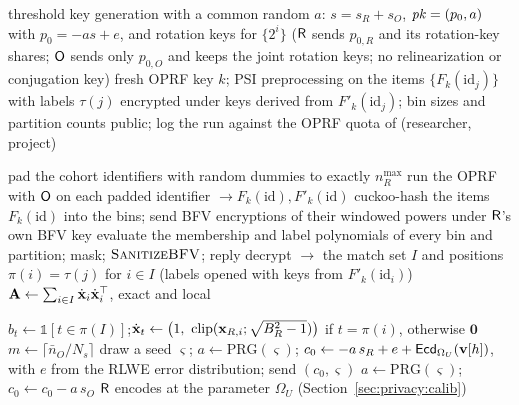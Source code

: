 \begin{algorithm}[p]
\begin{algorithmic}[1]
\State \Bdo threshold key generation with a common random $a$: $s=s_R+s_O$, $\mathit{pk}=(p_0,a)$ with $p_0=-as+e$, and rotation keys for $\{2^i\}$
\Statex \hspace{\algorithmicindent}($\textsf{R}$ sends $p_{0,R}$ and its rotation-key shares; $\textsf{O}$ sends only $p_{0,O}$ and keeps the joint rotation keys; no relinearization or conjugation key)
\State \Odo fresh OPRF key $k$; PSI preprocessing on the items $\{F_k(\mathrm{id}_j)\}$ with labels $\tau(j)$ encrypted under keys derived from $F'_k(\mathrm{id}_j)$; bin sizes and partition counts public; log the run against the OPRF quota of (researcher, project)
\end{algorithmic}
\end{algorithm}

\begin{algorithm}[p]
\caption{\textsc{Link}: labeled PSI with an OPRF (Phase~1)}
\label{alg:link}
\small
\begin{algorithmic}[1]
\State \Rdo pad the cohort identifiers with random dummies to exactly $n_R^{\max}$
\State \Rdo run the OPRF with $\textsf{O}$ on each padded identifier $\to F_k(\mathrm{id}),F'_k(\mathrm{id})$ 
\State \Rdo cuckoo-hash the items $F_k(\mathrm{id})$ into the bins; send BFV encryptions of their windowed powers under $\textsf{R}$'s own BFV key
\State \Odo evaluate the membership and label polynomials of every bin and partition; mask; $\textsc{SanitizeBFV}$; reply 
\State \Rdo decrypt $\to$ the match set $I$ and positions $\pi(i)=\tau(j)$ for $i\in I$ (labels opened with keys from $F'_k(\mathrm{id}_i)$)
\State \Rdo $\mathbf{A}\gets\sum_{i\in I}\dot{\mathbf{x}}_i\dot{\mathbf{x}}_i^\top$, exact and local 
\end{algorithmic}
\end{algorithm}

\begin{algorithm}[p]
\caption{\textsc{Upload} (Phase~2)}
\label{alg:upload}
\small
\begin{algorithmic}[1]
  \State \Rdo $b_t\gets\mathbb{1}[t\in\pi(I)]$;\quad $\bxd_t\gets\bigl(1,\ \mathrm{clip}(\bx_{R,i};\sqrt{B_R^2-1})\bigr)$ if $t=\pi(i)$, otherwise $\mathbf 0$
\EndFor
\State $m\gets\lceil\bar n_O/N_s\rceil$ 
  \State \Rdo draw a seed $\varsigma$; $a\gets\mathrm{PRG}(\varsigma)$; $c_0\gets-a\,s_R+e+\mathsf{Ecd}_{\Omega_U}(\mathbf v[h])$, with $e$ from the RLWE error distribution; send $(c_0,\varsigma)$
  \State \Odo $a\gets\mathrm{PRG}(\varsigma)$;\ $c_0\gets c_0-a\,s_O$ 
\EndFor
\Statex $\textsf{R}$ encodes at the parameter $\Omega_U$ (Section~\ref{sec:privacy:calib})
\end{algorithmic}
\end{algorithm}

